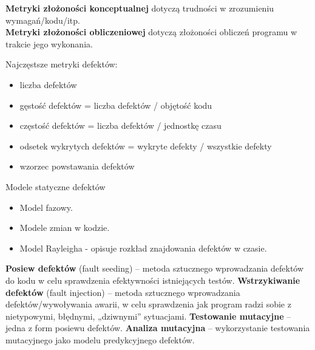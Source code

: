 \documentclass[../main.tex]{subfiles}
\begin{document}
    \textbf{Metryki złożoności konceptualnej} dotyczą trudności w zrozumieniu wymagań/kodu/itp.\\

    \textbf{Metryki złożoności obliczeniowej} dotyczą złożoności obliczeń programu w trakcie jego wykonania.

   Najczęstsze metryki defektów:
    \begin{itemize}
        \item liczba defektów
        \item gęstość defektów = liczba defektów / objętość kodu
        \item częstość defektów = liczba defektów / jednostkę czasu
        \item odsetek wykrytych defektów = wykryte defekty / wszystkie defekty
        \item wzorzec powstawania defektów
\end{itemize}

    Modele statyczne defektów
    \begin{itemize}
        \item Model fazowy.
        \item Modele zmian w kodzie.
        \item Model Rayleigha - opisuje rozkład znajdowania defektów w czasie.
\end{itemize}

    \textbf{Posiew defektów} (fault seeding) – metoda sztucznego wprowadzania defektów do kodu w
    celu sprawdzenia efektywności istniejących testów.
    \textbf{Wstrzykiwanie defektów} (fault injection) – metoda sztucznego wprowadzania defektów/wywoływania
    awarii, w celu sprawdzenia jak program radzi sobie z nietypowymi, błędnymi, „dziwnymi” sytuacjami.
    \textbf{Testowanie mutacyjne} – jedna z form posiewu defektów.
    \textbf{Analiza mutacyjna} – wykorzystanie testowania mutacyjnego jako modelu predykcyjnego defektów.
\end{document}
